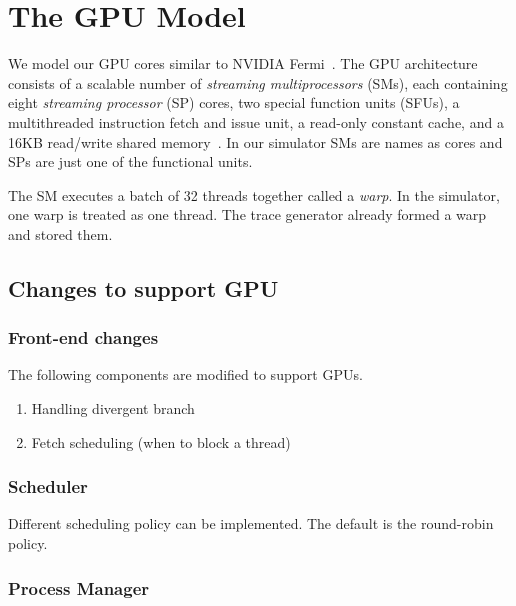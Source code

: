 
\clearpage
\section{The GPU Model}


We model our GPU cores similar to NVIDIA Fermi~\cite{fermi}.
The GPU architecture consists of a scalable number of {\em streaming
multiprocessors} (SMs), each containing eight {\em streaming processor}
(SP) cores, two special function units (SFUs), a multithreaded
instruction fetch and issue unit, a read-only constant cache, and a
16KB read/write shared memory~\cite{lin:nic08}.
In our simulator SMs are names as cores and SPs are just one of the functional units. 



The SM executes a batch of 32 threads together called a {\em
warp}. In the simulator, one warp is treated as one thread. 
The trace generator already formed a warp and stored them. 

\subsection{Changes to support GPU}
\subsubsection{Front-end changes}
The following components are modified to support GPUs. 
\begin{enumerate}
\item Handling divergent branch
\item Fetch scheduling (when to block a thread)
\end{enumerate}
\subsubsection{Scheduler}
Different scheduling policy can be implemented. The default is the round-robin policy. 

\subsubsection{Process Manager}


